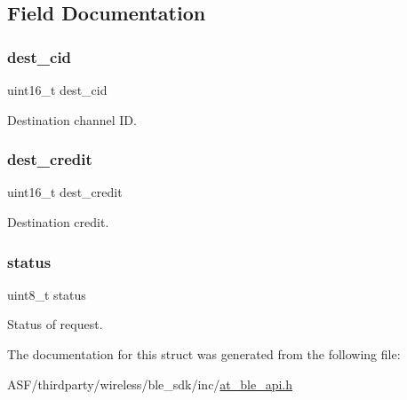 \subsection{Field Documentation}
\mbox{\label{structat__ble__lecb__send__rsp__t_a37d822ac0a55245d703099a527d6bd3a}} 
\subsubsection{\texorpdfstring{dest\_cid}{dest\_cid}}
{\footnotesize\ttfamily uint16\+\_\+t dest\+\_\+cid}



Destination channel ID. 

\mbox{\label{structat__ble__lecb__send__rsp__t_ac885778ddeb570d83c60b0d142d9de73}} 
\subsubsection{\texorpdfstring{dest\_credit}{dest\_credit}}
{\footnotesize\ttfamily uint16\+\_\+t dest\+\_\+credit}



Destination credit. 

\mbox{\label{structat__ble__lecb__send__rsp__t_ade818037fd6c985038ff29656089758d}} 
\subsubsection{\texorpdfstring{status}{status}}
{\footnotesize\ttfamily uint8\+\_\+t status}



Status of request. 



The documentation for this struct was generated from the following file\+:\begin{DoxyCompactItemize}
\item 
A\+S\+F/thirdparty/wireless/ble\+\_\+sdk/inc/\mbox{\hyperlink{at__ble__api_8h}{at\+\_\+ble\+\_\+api.\+h}}\end{DoxyCompactItemize}
